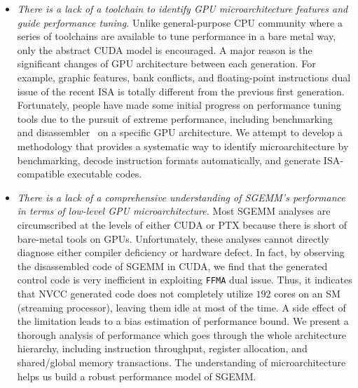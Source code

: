 \documentclass{sig-alternate-05-2015}
\begin{document}
\begin{itemize}
\item {\em There is a lack of a toolchain to identify GPU microarchitecture features and guide performance tuning.} Unlike general-purpose CPU community where a series of toolchains are available to tune performance in a bare metal way, only the abstract CUDA model is encouraged. A major reason is the significant changes of GPU architecture between each generation. For example, graphic features, bank conflicts, and floating-point instructions dual issue of the recent ISA is totally different from the previous first generation. Fortunately, people have made some initial progress on performance tuning tools due to the pursuit of extreme performance, including benchmarking~\cite{} and disassembler~\cite{} on a specific GPU architecture. We attempt to develop a methodology that provides a systematic way to identify microarchitecture by benchmarking, decode instruction formats automatically, and generate ISA-compatible executable codes.
\item {\em There is a lack of a comprehensive understanding of SGEMM's performance in terms of low-level GPU microarchitecture.} Most SGEMM analyses are circumscribed at the levels of either CUDA or PTX because there is short of bare-metal tools on GPUs. Unfortunately, these analyses cannot directly diagnose either compiler deficiency or hardware defect. In fact, by observing the disassembled code of SGEMM in CUDA, we find that the generated control code is very inefficient in exploiting {\tt FFMA} dual issue. Thus, it indicates that NVCC generated code does not completely utilize $192$ cores on an SM (streaming processor), leaving them idle at most of the time. A side effect of the limitation leads to a bias estimation of performance bound. We present a thorough analysis of performance which goes through the whole architecture hierarchy, including instruction throughput, register allocation, and shared/global memory transactions. The understanding of microarchitecture helps us build a robust performance model of SGEMM.
\end{itemize}
\end{document}

